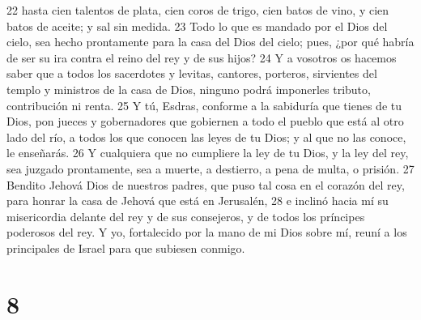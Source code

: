 22 hasta cien talentos de plata,  cien coros de trigo, cien batos de vino, y cien batos de aceite; y sal sin medida.
23 Todo lo que es mandado por el Dios del cielo, sea hecho prontamente para la casa del Dios del cielo; pues, ¿por qué habría de ser su ira contra el reino del rey y de sus hijos?
24 Y a vosotros os hacemos saber que a todos los sacerdotes y levitas, cantores, porteros, sirvientes del templo y ministros de la casa de Dios, ninguno podrá imponerles tributo, contribución ni renta.
25 Y tú, Esdras, conforme a la sabiduría que tienes de tu Dios, pon jueces y gobernadores que gobiernen a todo el pueblo que está al otro lado del río, a todos los que conocen las leyes de tu Dios; y al que no las conoce, le enseñarás.
26 Y cualquiera que no cumpliere la ley de tu Dios, y la ley del rey, sea juzgado prontamente, sea a muerte, a destierro, a pena de multa, o prisión.
27 Bendito Jehová Dios de nuestros padres, que puso tal cosa en el corazón del rey, para honrar la casa de Jehová que está en Jerusalén,
28 e inclinó hacia mí su misericordia delante del rey y de sus consejeros, y de todos los príncipes poderosos del rey. Y yo, fortalecido por la mano de mi Dios sobre mí, reuní a los principales de Israel para que subiesen conmigo. 

\chapter{8}


